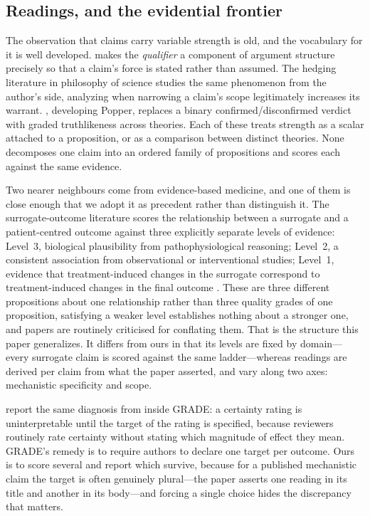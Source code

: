 \documentclass{article}
\begin{document}
\subsection{Readings, and the evidential frontier}
\label{sec:related-readings}

The observation that claims carry variable strength is old, and the vocabulary for it is well developed. \citet{toulmin1958uses} makes the \emph{qualifier} a component of argument structure precisely so that a claim's force is stated rather than assumed. The hedging literature in philosophy of science studies the same phenomenon from the author's side, analyzing when narrowing a claim's scope legitimately increases its warrant. \citet{niiniluoto1987truthlikeness}, developing Popper, replaces a binary confirmed/disconfirmed verdict with graded truthlikeness across theories. Each of these treats strength as a scalar attached to a proposition, or as a comparison between distinct theories. None decomposes one claim into an ordered family of propositions and scores each against the same evidence.

Two nearer neighbours come from evidence-based medicine, and one of them is close enough that we adopt it as precedent rather than distinguish it. The surrogate-outcome literature scores the relationship between a surrogate and a patient-centred outcome against three explicitly separate levels of evidence: Level~3, biological plausibility from pathophysiological reasoning; Level~2, a consistent association from observational or interventional studies; Level~1, evidence that treatment-induced changes in the surrogate correspond to treatment-induced changes in the final outcome \citep{euhta2024outcomes}. These are three different propositions about one relationship rather than three quality grades of one proposition, satisfying a weaker level establishes nothing about a stronger one, and papers are routinely criticised for conflating them. That is the structure this paper generalizes. It differs from ours in that its levels are fixed by domain---every surrogate claim is scored against the same ladder---whereas readings are derived per claim from what the paper asserted, and vary along two axes: mechanistic specificity and scope.

\citet{hultcrantz2017grade} report the same diagnosis from inside GRADE: a certainty rating is uninterpretable until the target of the rating is specified, because reviewers routinely rate certainty without stating which magnitude of effect they mean. GRADE's remedy is to require authors to declare one target per outcome. Ours is to score several and report which survive, because for a published mechanistic claim the target is often genuinely plural---the paper asserts one reading in its title and another in its body---and forcing a single choice hides the discrepancy that matters.
\end{document}
